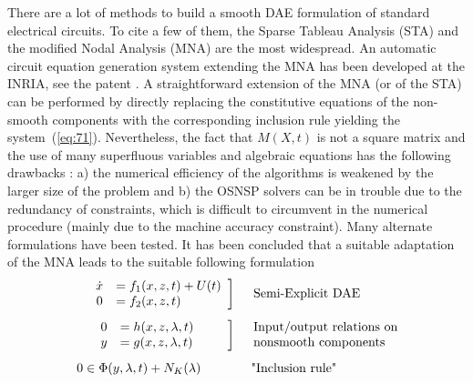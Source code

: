  There are a lot of methods to build a smooth DAE formulation of standard electrical circuits. To cite a few of them, the Sparse Tableau Analysis (STA) and the modified Nodal Analysis (MNA) are the most widespread. An automatic circuit equation generation system extending the MNA has been developed at the INRIA, see the patent \cite{brevet}. A straightforward extension of the MNA (or of the STA) can be performed by directly replacing the constitutive equations of the non-smooth components with the corresponding inclusion rule yielding the system~(\ref{eq:71}).  Nevertheless, the fact that $M(X,t)$ is not a square matrix and the use of many superfluous variables and algebraic equations has the following drawbacks : a) the numerical efficiency of the algorithms is weakened by the larger size of the problem and b) the OSNSP solvers can be in trouble due to the redundancy of constraints, which is difficult to circumvent in the numerical procedure (mainly due to the machine accuracy constraint). Many alternate formulations have been tested. It has been concluded that a suitable adaptation of the MNA leads to the suitable following formulation
\begin{equation}
  \label{eq:SEDGE}
{  \begin{array}{r l}
      \left.\begin{array}{cl}
        \dot x 
               & = f_1(x,z,t) + U(t) \\
            0   & =  f_2(x,z,t)
      \end{array}\right]
    &
    \begin{array}{l}
      \text{\small Semi-Explicit DAE}
    \end{array}
    \\[5mm]
  \left.\begin{array}{cl}
0 &= h(x,z,\lambda,t)\quad\quad\,\\
y &= g(x,z,\lambda,t)\\
  \end{array}\right] & \begin{array}{l}
   \text{\small Input/output relations on}\\
   \text{\small  nonsmooth components}
  \end{array} \\[5mm]
  \left.\begin{array}{l}
  0 \in \Phi(y,\lambda,t) + N_K(\lambda)\quad\quad
\end{array}\right.
& \text{ \small "Inclusion rule"}\\
\end{array}}
\end{equation}
